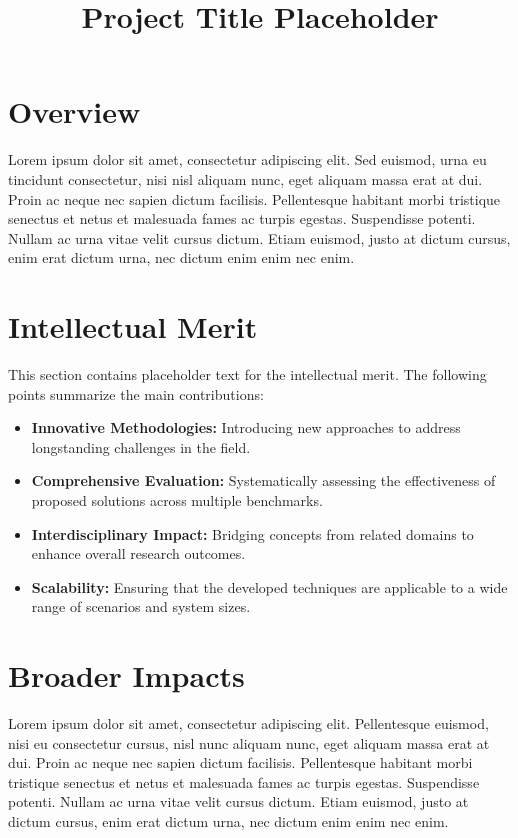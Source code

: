 \documentclass[tight,nopagenumbers]{proposal}
\title{Project Title Placeholder}
\begin{document}
\maketitle

\section*{Overview}

Lorem ipsum dolor sit amet, consectetur adipiscing elit. Sed euismod, urna eu tincidunt consectetur, nisi nisl aliquam nunc, eget aliquam massa erat at dui. Proin ac neque nec sapien dictum facilisis. Pellentesque habitant morbi tristique senectus et netus et malesuada fames ac turpis egestas. Suspendisse potenti. Nullam ac urna vitae velit cursus dictum. Etiam euismod, justo at dictum cursus, enim erat dictum urna, nec dictum enim enim nec enim.

\section*{Intellectual Merit}

This section contains placeholder text for the intellectual merit. The following points summarize the main contributions:

\begin{itemize}[nosep]
    \item \textbf{Innovative Methodologies:} Introducing new approaches to address longstanding challenges in the field.
    \item \textbf{Comprehensive Evaluation:} Systematically assessing the effectiveness of proposed solutions across multiple benchmarks.
    \item \textbf{Interdisciplinary Impact:} Bridging concepts from related domains to enhance overall research outcomes.
    \item \textbf{Scalability:} Ensuring that the developed techniques are applicable to a wide range of scenarios and system sizes.
\end{itemize}

\section*{Broader Impacts}

Lorem ipsum dolor sit amet, consectetur adipiscing elit. Pellentesque euismod, nisi eu consectetur cursus, nisl nunc aliquam nunc, eget aliquam massa erat at dui. Proin ac neque nec sapien dictum facilisis. Pellentesque habitant morbi tristique senectus et netus et malesuada fames ac turpis egestas. Suspendisse potenti. Nullam ac urna vitae velit cursus dictum. Etiam euismod, justo at dictum cursus, enim erat dictum urna, nec dictum enim enim nec enim.
\end{document}
